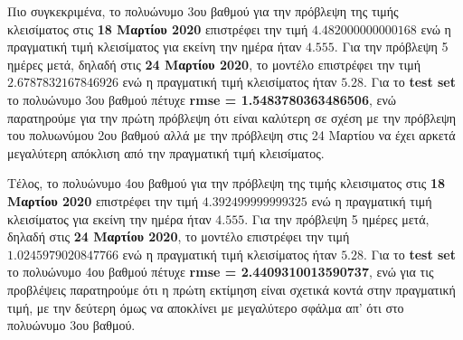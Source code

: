 \documentclass[Second Project.tex]{subfiles}
\begin{document}
Πιο συγκεκριμένα, το πολυώνυμο 3ου βαθμού για την πρόβλεψη της τιμής κλεισίματος στις \textbf{18 Μαρτίου 2020} 
επιστρέφει την τιμή $4.482000000000168$ ενώ η πραγματική τιμή κλεισίματος για εκείνη την ημέρα ήταν
$4.555$. Για την πρόβλεψη 5 ημέρες μετά, δηλαδή στις \textbf{24 Μαρτίου 2020}, το μοντέλο επιστρέφει την τιμή 
$2.6787832167846926$ ενώ η πραγματική τιμή κλεισίματος ήταν $5.28$. Για το \textlatin{\textbf{test set}} το
πολυώνυμο 3ου βαθμού πέτυχε \textbf{\textlatin{rmse} = 1.5483780363486506}, ενώ παρατηρούμε για την πρώτη 
πρόβλεψη ότι είναι καλύτερη σε σχέση με την πρόβλεψη του πολυωνύμου 2ου βαθμού αλλά με την πρόβλεψη στις 24
Μαρτίου να έχει αρκετά μεγαλύτερη απόκλιση από την πραγματική τιμή κλεισίματος. 

Τέλος, το πολυώνυμο 4ου βαθμού για την πρόβλεψη της τιμής κλεισιματος στις \textbf{18 Μαρτίου 2020} 
επιστρέφει την τιμή $4.392499999999325$ ενώ η πραγματική τιμή κλεισίματος για εκείνη την ημέρα ήταν
$4.555$. Για την πρόβλεψη 5 ημέρες μετά, δηλαδή στις \textbf{24 Μαρτίου 2020}, το μοντέλο επιστρέφει την τιμή 
$1.0245979020847766$ ενώ η πραγματική τιμή κλεισίματος ήταν $5.28$. Για το \textlatin{\textbf{test set}} το
πολυώνυμο 4ου βαθμού πέτυχε \textbf{\textlatin{rmse} = 2.4409310013590737}, ενώ για τις προβλέψεις παρατηρούμε 
ότι η πρώτη εκτίμηση είναι σχετικά κοντά στην πραγματική τιμή, με την δεύτερη όμως να αποκλίνει με μεγαλύτερο 
σφάλμα απ' ότι στο πολυώνυμο 3ου βαθμού.
\end{document}
